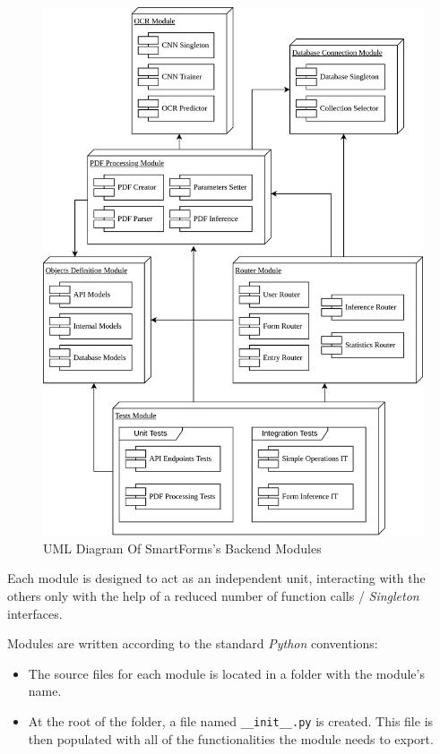 \documentclass[11pt, a4paper]{report}
\def\code#1{\texttt{#1}}
\begin{document}
\begin{figure}[!h]
    \centering
    \includegraphics[width=37em]{images/diagrams/ProjectModulesDiagram.png}
    \caption{UML Diagram Of SmartForms's Backend Modules}
    \label{fig:label}
\end{figure}

Each module is designed to act as an independent unit, interacting with the others only with the help of a reduced number of function calls / \textit{Singleton} interfaces.

Modules are written according to the standard \textit{Python} conventions:
\begin{itemize}
    \item The source files for each module is located in a folder with the module's name.
    \item At the root of the folder, a file named \code{\_\_init\_\_.py} is created. This file is then populated with all of the functionalities the module needs to export.
\end{itemize}
\end{document}
